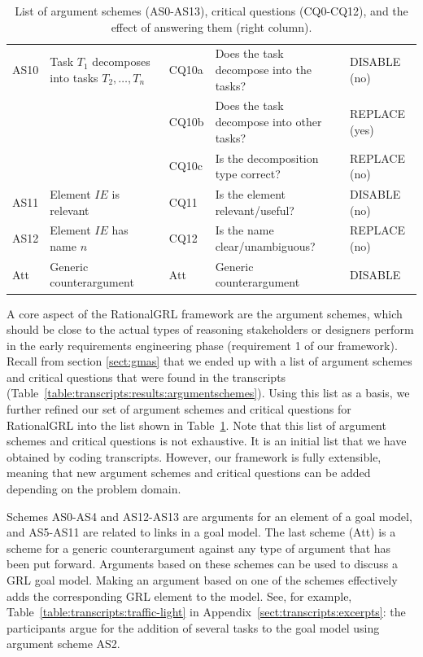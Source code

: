 \begin{table}[t]
\begin{tabularx}{\textwidth}{|l|l|l|X|l|}
\hline
AS10 & Task $T_1$ decomposes into tasks $T_2,\ldots,T_n$ & CQ10a & Does the task decompose into the tasks?& \textsf{DISABLE} (no)\\
 &  & CQ10b & Does the task decompose into other tasks?& \textsf{REPLACE} (yes)\\
 &  & CQ10c & Is the decomposition type correct? & \textsf{REPLACE} (no)\\
\hline
AS11 & Element $IE$ is relevant & CQ11 & Is the element relevant/useful? & \textsf{DISABLE} (no)\\
\hline
AS12 & Element $IE$ has name $n$ & CQ12 & Is the name clear/unambiguous? & \textsf{REPLACE} (no)\\
\hline
\hline
Att & Generic counterargument & Att & Generic counterargument & \textsf{DISABLE}\\
\hline
\end{tabularx}
\caption{List of argument schemes (AS0-AS13), critical questions (CQ0-CQ12), and the effect of answering them (right column).}
\label{table:argument-schemes}
\end{table}

A core aspect of the RationalGRL framework are the argument schemes, which should be close to the actual types of reasoning stakeholders or designers perform in the early requirements engineering phase (requirement 1 of our framework). Recall from section \ref{sect:gmas} that we ended up with a list of argument schemes and critical questions that were found in the transcripts (Table~\ref{table:transcripts:results:argumentschemes}). Using this list as a basis, we further refined our set of argument schemes and critical questions for RationalGRL into the list shown in Table~\ref{table:argument-schemes}. Note that this list of argument schemes and critical questions is not exhaustive. It is an initial list that we have obtained by coding transcripts. However, our framework is fully extensible, meaning that new argument schemes and critical questions can be added depending on the problem domain.

Schemes AS0-AS4 and AS12-AS13 are arguments for an element of a goal model, and AS5-AS11 are related to links in a goal model. The last scheme (Att) is a scheme for a generic counterargument against any type of argument that has been put forward. Arguments based on these schemes can be used to discuss a GRL goal model. Making an argument based on one of the schemes effectively adds the corresponding GRL element to the model. See, for example, Table~\ref{table:transcripts:traffic-light} in Appendix~\ref{sect:transcripts:excerpts}: the participants argue for the addition of several tasks to the goal model using argument scheme AS2. 

